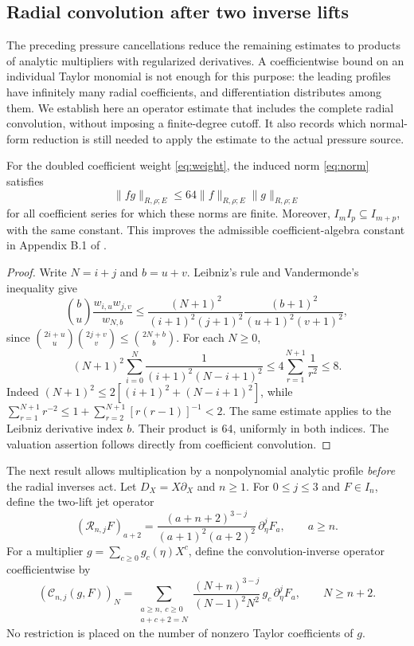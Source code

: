 \subsection{Radial convolution after two inverse lifts}
\label{subsec:two-lift-convolution}

The preceding pressure cancellations reduce the remaining estimates to products of analytic multipliers with regularized derivatives. A coefficientwise bound on an individual Taylor monomial is not enough for this purpose: the leading profiles have infinitely many radial coefficients, and differentiation distributes among them. We establish here an operator estimate that includes the complete radial convolution, without imposing a finite-degree cutoff. It also records which normal-form reduction is still needed to apply the estimate to the actual pressure source.

\begin{theorem}\label{thm:algebra64}
For the doubled coefficient weight \eqref{eq:weight}, the induced norm \eqref{eq:norm} satisfies
\begin{equation}\label{eq:algebra64}
 \|fg\|_{R,\rho;E}\le 64\|f\|_{R,\rho;E}\|g\|_{R,\rho;E}
\end{equation}
for all coefficient series for which these norms are finite. Moreover, $I_mI_p\subseteq I_{m+p}$, with the same constant. This improves the admissible coefficient-algebra constant in Appendix B.1 of \cite{newton2026}.
\end{theorem}
\begin{proof}
Write $N=i+j$ and $b=u+v$. Leibniz's rule and Vandermonde's inequality give
\[
 \binom b u\frac{w_{i,u}w_{j,v}}{w_{N,b}}
 \le \frac{(N+1)^2}{(i+1)^2(j+1)^2}
       \frac{(b+1)^2}{(u+1)^2(v+1)^2},
\]
since $\binom{2i+u}{u}\binom{2j+v}{v}\le\binom{2N+b}{b}$.
For each $N\ge0$,
\[
 (N+1)^2\sum_{i=0}^N\frac1{(i+1)^2(N-i+1)^2}
 \le4\sum_{r=1}^{N+1}\frac1{r^2}\le8.
\]
Indeed $(N+1)^2\le 2[(i+1)^2+(N-i+1)^2]$, while
$\sum_{r=1}^{N+1}r^{-2}\le1+\sum_{r=2}^{N+1}[r(r-1)]^{-1}<2$.
The same estimate applies to the Leibniz derivative index $b$. Their product is $64$, uniformly in both indices. The valuation assertion follows directly from coefficient convolution.
\end{proof}

The next result allows multiplication by a nonpolynomial analytic profile \emph{before} the radial inverses act. Let $D_X=X\partial_X$ and $n\ge1$. For $0\le j\le3$ and $F\in I_n$, define the two-lift jet operator
\begin{equation}\label{eq:regularized-jet}
 (\mathcal R_{n,j}F)_{a+2}
 =\frac{(a+n+2)^{3-j}}{(a+1)^2(a+2)^2}\,\partial_\eta^j F_a,
 \qquad a\ge n.
\end{equation}
For a multiplier $g=\sum_{c\ge0}g_c(\eta)X^c$, define the convolution-inverse operator coefficientwise by
\begin{equation}\label{eq:radial-convolution}
 (\mathcal C_{n,j}(g,F))_{N}
 =\sum_{\substack{a\ge n,\ c\ge0\\a+c+2=N}}
 \frac{(N+n)^{3-j}}{(N-1)^2N^2}\,
 g_c\,\partial_\eta^jF_a,
 \qquad N\ge n+2.
\end{equation}
No restriction is placed on the number of nonzero Taylor coefficients of $g$.

